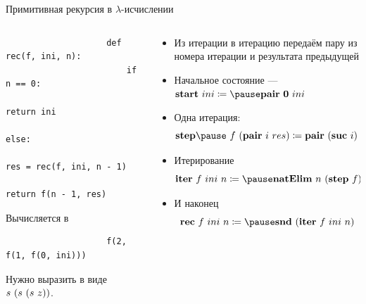     \begin{frame}[fragile]{Примитивная рекурсия в $\lambda$-исчислении}
        \begin{columns}[onlytextwidth]
            \begin{column}{0.385\textwidth}
                \vspace{-1em}
                \begin{verbatim}
                    def rec(f, ini, n):
                        if n == 0:
                            return ini
                        else:
                            res = rec(f, ini, n - 1)
                            return f(n - 1, res)
                \end{verbatim}
                \vspace{0.5em}
                Вычисляется в
                \begin{verbatim}
                    f(2, f(1, f(0, ini)))
                \end{verbatim}
                \vspace{0.5em}
                Нужно выразить в виде
                $s ~ (s ~ (s ~ z))$.
            \end{column}\hfill%
            \pause
            \begin{column}{0.585\textwidth}
                \begin{itemize}
                    \item Из итерации в итерацию передаём пару из номера итерации и результата предыдущей
                    \item Начальное состояние --- $\term{start} \ap ini \termdef \pause \term{pair} \ap \term{0} \ap ini$
                    \item Одна итерация:
                    \[
                        \term{step} \pause \ap f \ap (\term{pair} \ap i \ap res)
                        \termdef
                        \term{pair} \ap (\term{suc} \ap i) \ap (f \ap i \ap res)
                    \] \vspace{-1em}
                    \item Итерирование
                    \[
                        \term{iter} \ap f \ap ini \ap n
                        \termdef
                        \pause \term{natElim} \ap n \ap (\term{step} \ap f) \ap (\term{start} \ap ini)
                    \] \vspace{-1em}
                    \item И наконец
                    \[
                        \term{rec} \ap f \ap ini \ap n
                        \termdef
                        \pause \term{snd} \ap (\term{iter} \ap f \ap ini \ap n)
                    \] \vspace{-1em}
                \end{itemize}
            \end{column}
        \end{columns}
    \end{frame}

